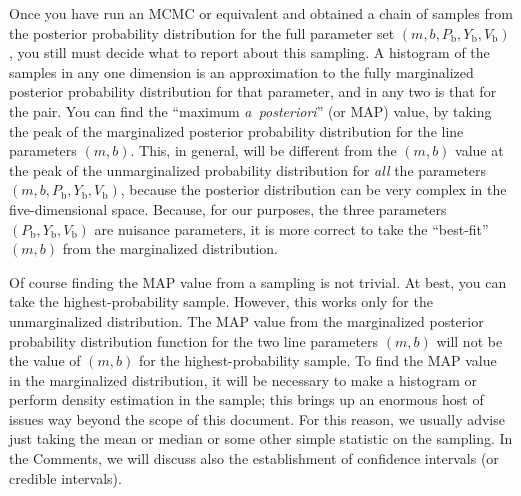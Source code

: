 \documentclass[12pt,twoside]{article}
\newcommand{\notenglish}[1]{\textsl{#1}}
\newcommand{\aposteriori}{\notenglish{a~posteriori}}
\newcommand{\documentname}{document}
\newcommand{\commentsname}{Comments}
\newcommand{\Pbad}{P_{\mathrm{b}}}
\newcommand{\Ybad}{Y_{\mathrm{b}}}
\newcommand{\Vbad}{V_{\mathrm{b}}}
\begin{document}
Once you have run an MCMC or equivalent and obtained a chain of
samples from the posterior probability distribution for the full
parameter set $(m,b,\Pbad,\Ybad,\Vbad)$, you still must decide what to
report about this sampling.  A histogram of the samples in any one
dimension is an approximation to the fully marginalized posterior
probability distribution for that parameter, and in any two is that
for the pair.  You can find the ``maximum \aposteriori'' (or MAP)
value, by taking the peak of the marginalized posterior probability
distribution for the line parameters $(m,b)$.  This, in general, will
be different from the $(m,b)$ value at the peak of the unmarginalized
probability distribution for \emph{all} the parameters
$(m,b,\Pbad,\Ybad,\Vbad)$, because the posterior distribution can be
very complex in the five-dimensional space.  Because, for our
purposes, the three parameters $(\Pbad,\Ybad,\Vbad)$ are nuisance
parameters, it is more correct to take the ``best-fit'' $(m,b)$ from
the marginalized distribution.

Of course finding the MAP value from a sampling is not trivial.  At
best, you can take the highest-probability sample.  However, this
works only for the unmarginalized distribution.  The MAP value from
the marginalized posterior probability distribution function for the
two line parameters $(m,b)$ will not be the value of $(m,b)$ for the
highest-probability sample.  To find the MAP value in the marginalized
distribution, it will be necessary to make a histogram or perform
density estimation in the sample; this brings up an enormous host of
issues way beyond the scope of this \documentname.  For this reason,
we usually advise just taking the mean or median or some other simple
statistic on the sampling.  In the \commentsname, we will discuss also
the establishment of confidence intervals (or credible intervals).
\end{document}
